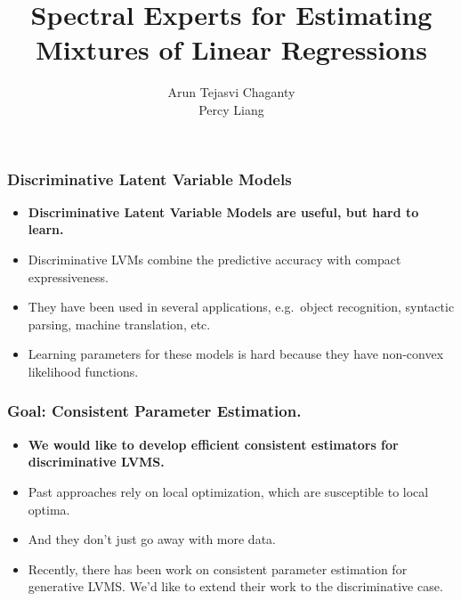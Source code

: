 \documentclass[xcolor={svgnames}]{beamer}
\title[Spectral Experts]{Spectral Experts for Estimating Mixtures of Linear Regressions}
\author[Chaganty, Liang]{%
    Arun Tejasvi Chaganty\\
    Percy Liang
}
\institute{Stanford University}
\begin{document}

\begin{frame}
  \titlepage
\end{frame}

\begin{frame}
  \frametitle{Discriminative Latent Variable Models}

  \begin{itemize}
    \item {\bf Discriminative Latent Variable Models are useful, but hard to learn.}
    \item Discriminative LVMs combine the predictive accuracy with compact expressiveness.
    \item They have been used in several applications, e.g.\ object recognition, syntactic parsing, machine translation, etc.
    \item Learning parameters for these models is hard because they have non-convex likelihood functions.
  \end{itemize}
\end{frame}

\begin{frame}
  \frametitle{Goal: Consistent Parameter Estimation.}

  \begin{itemize}
    \item {\bf We would like to develop efficient consistent estimators for discriminative LVMS.}
    \item Past approaches rely on local optimization, which are susceptible to local optima.
    \item And they don't just go away with more data.
    \item Recently, there has been work on consistent parameter
      estimation for generative LVMS\@. We'd like to extend their work to
      the discriminative case.
  \end{itemize}
\end{frame}
\end{document}
